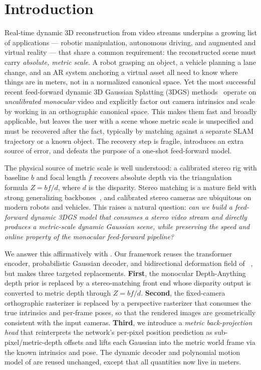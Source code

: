 \section{Introduction}
\label{sec:intro}

Real-time dynamic 3D reconstruction from video streams underpins a growing
list of applications --- robotic manipulation, autonomous driving, and
augmented and virtual reality --- that share a common requirement: the
reconstructed scene must carry \emph{absolute, metric scale}. A robot
grasping an object, a vehicle planning a lane change, and an AR system
anchoring a virtual asset all need to know where things are in meters, not
in a normalized canonical space. Yet the most successful recent feed-forward
dynamic 3D Gaussian Splatting (3DGS) methods~\cite{wu2026streamsplat}
operate on \emph{uncalibrated monocular} video and explicitly factor out
camera intrinsics and scale by working in an orthographic canonical space.
This makes them fast and broadly applicable, but leaves the user with a
scene whose metric scale is unspecified and must be recovered after the
fact, typically by matching against a separate SLAM trajectory or a known
object. The recovery step is fragile, introduces an extra source of error,
and defeats the purpose of a one-shot feed-forward model.

The physical source of metric scale is well understood: a calibrated stereo
rig with baseline $b$ and focal length $f$ recovers absolute depth via the
triangulation formula $Z = b f / d$, where $d$ is the disparity. Stereo
matching is a mature field with strong generalizing
backbones~\cite{xu2023igev}, and calibrated stereo cameras are ubiquitous
on modern robots and vehicles. This raises a natural question: \emph{can we
build a feed-forward dynamic 3DGS model that consumes a stereo video stream
and directly produces a metric-scale dynamic Gaussian scene, while
preserving the speed and online property of the monocular feed-forward
pipeline?}

We answer this affirmatively with \StereoSplat. Our framework reuses the
transformer encoder, probabilistic Gaussian decoder, and bidirectional
deformation field of \StreamSplat~\cite{wu2026streamsplat}, but makes three
targeted replacements. \textbf{First}, the monocular Depth-Anything depth
prior is replaced by a stereo-matching front end whose disparity output is
converted to metric depth through $Z = b f / d$. \textbf{Second}, the
fixed-camera orthographic rasterizer is replaced by a perspective
rasterizer that consumes the true intrinsics and per-frame poses, so that
the rendered images are geometrically consistent with the input cameras.
\textbf{Third}, we introduce a \emph{metric back-projection head} that
reinterprets the network's per-pixel position prediction as
sub-pixel/metric-depth offsets and lifts each Gaussian into the metric
world frame via the known intrinsics and pose. The dynamic decoder and
polynomial motion model of \StreamSplat are reused unchanged, except that
all quantities now live in meters.

